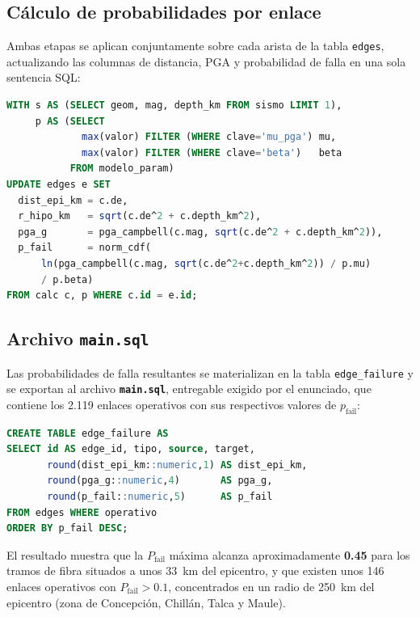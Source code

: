 \documentclass[12pt,a4paper]{article}
\begin{document}
\subsection{Cálculo de probabilidades por enlace}

Ambas etapas se aplican conjuntamente sobre cada arista de la tabla
\texttt{edges}, actualizando las columnas de distancia, PGA y probabilidad
de falla en una sola sentencia SQL:

\begin{lstlisting}[language=SQL,caption={Cálculo de $p_{\text{fail}}$ por enlace (05\_modelo\_falla.sql)}]
WITH s AS (SELECT geom, mag, depth_km FROM sismo LIMIT 1),
     p AS (SELECT
             max(valor) FILTER (WHERE clave='mu_pga') mu,
             max(valor) FILTER (WHERE clave='beta')   beta
           FROM modelo_param)
UPDATE edges e SET
  dist_epi_km = c.de,
  r_hipo_km   = sqrt(c.de^2 + c.depth_km^2),
  pga_g       = pga_campbell(c.mag, sqrt(c.de^2 + c.depth_km^2)),
  p_fail      = norm_cdf(
      ln(pga_campbell(c.mag, sqrt(c.de^2+c.depth_km^2)) / p.mu)
      / p.beta)
FROM calc c, p WHERE c.id = e.id;
\end{lstlisting}

\subsection{Archivo \texttt{main.sql}}

Las probabilidades de falla resultantes se materializan en la tabla
\texttt{edge\_failure} y se exportan al archivo \textbf{\texttt{main.sql}},
entregable exigido por el enunciado, que contiene los 2.119 enlaces
operativos con sus respectivos valores de $p_{\text{fail}}$:

\begin{lstlisting}[language=SQL,caption={Tabla de probabilidades (main.sql)}]
CREATE TABLE edge_failure AS
SELECT id AS edge_id, tipo, source, target,
       round(dist_epi_km::numeric,1) AS dist_epi_km,
       round(pga_g::numeric,4)       AS pga_g,
       round(p_fail::numeric,5)      AS p_fail
FROM edges WHERE operativo
ORDER BY p_fail DESC;
\end{lstlisting}

El resultado muestra que la $P_{\text{fail}}$ máxima alcanza
aproximadamente \textbf{0.45} para los tramos de fibra situados a unos
33~km del epicentro, y que existen unos 146 enlaces operativos con
$P_{\text{fail}} > 0.1$, concentrados en un radio de 250~km del epicentro
(zona de Concepción, Chillán, Talca y Maule).
\end{document}

